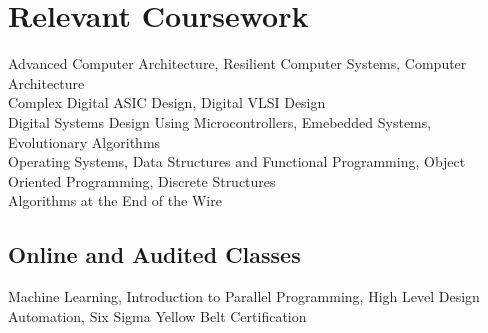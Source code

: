 \section{Relevant Coursework}
Advanced Computer Architecture, Resilient Computer Systems, Computer Architecture\\
Complex Digital ASIC Design, Digital VLSI Design \\
Digital Systems Design Using Microcontrollers,  Emebedded Systems, Evolutionary Algorithms \\
Operating Systems,  Data Structures and Functional Programming, Object Oriented Programming, Discrete Structures \\
Algorithms at the End of the Wire

\subsection{\textbf{Online and Audited Classes}}
Machine Learning, Introduction to Parallel Programming, High Level Design
Automation, Six Sigma Yellow Belt Certification
